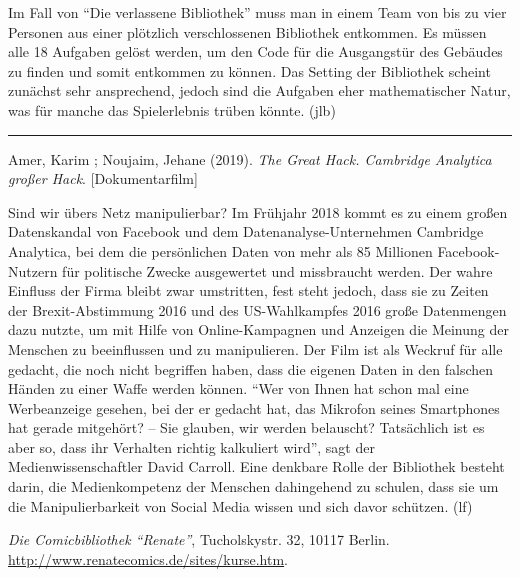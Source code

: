\documentclass[a4paper,
fontsize=11pt,
oneside,
numbers=noperiodatend,
parskip=half-,
bibliography=totoc,
final
]{scrartcl}
\begin{document}
Im Fall von \enquote{Die verlassene Bibliothek} muss man in einem Team
von bis zu vier Personen aus einer plötzlich verschlossenen Bibliothek
entkommen. Es müssen alle 18 Aufgaben gelöst werden, um den Code für die
Ausgangstür des Gebäudes zu finden und somit entkommen zu können. Das
Setting der Bibliothek scheint zunächst sehr ansprechend, jedoch sind
die Aufgaben eher mathematischer Natur, was für manche das Spielerlebnis
trüben könnte. (jlb)

\begin{center}\rule{0.5\linewidth}{0.5pt}\end{center}

Amer, Karim ; Noujaim, Jehane (2019). \emph{The Great Hack. Cambridge
Analytica großer Hack}. {[}Dokumentarfilm{]}

Sind wir übers Netz manipulierbar? Im Frühjahr 2018 kommt es zu einem
großen Datenskandal von Facebook und dem Datenanalyse-Unternehmen
Cambridge Analytica, bei dem die persönlichen Daten von mehr als 85
Millionen Facebook-Nutzern für politische Zwecke ausgewertet und
missbraucht werden. Der wahre Einfluss der Firma bleibt zwar umstritten,
fest steht jedoch, dass sie zu Zeiten der Brexit-Abstimmung 2016 und des
US-Wahlkampfes 2016 große Datenmengen dazu nutzte, um mit Hilfe von
Online-Kampagnen und Anzeigen die Meinung der Menschen zu beeinflussen
und zu manipulieren. Der Film ist als Weckruf für alle gedacht, die noch
nicht begriffen haben, dass die eigenen Daten in den falschen Händen zu
einer Waffe werden können. \enquote{Wer von Ihnen hat schon mal eine
Werbeanzeige gesehen, bei der er gedacht hat, das Mikrofon seines
Smartphones hat gerade mitgehört? -- Sie glauben, wir werden belauscht?
Tatsächlich ist es aber so, dass ihr Verhalten richtig kalkuliert wird},
sagt der Medienwissenschaftler David Carroll. Eine denkbare Rolle der
Bibliothek besteht darin, die Medienkompetenz der Menschen dahingehend
zu schulen, dass sie um die Manipulierbarkeit von Social Media wissen
und sich davor schützen. (lf)


\emph{Die Comicbibliothek \enquote{Renate}}, Tucholskystr. 32, 10117
Berlin. \url{http://www.renatecomics.de/sites/kurse.htm}.
\end{document}
